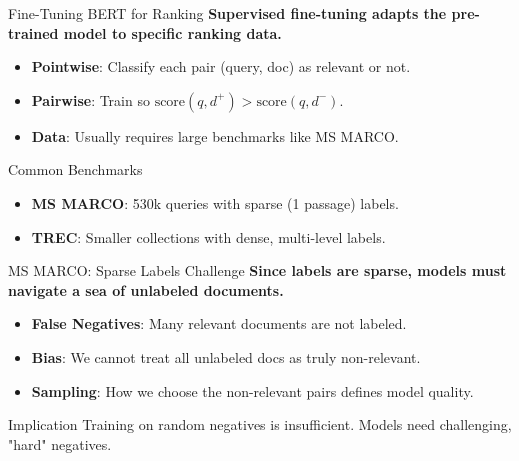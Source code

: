 \documentclass[aspectratio=169]{beamer}
\newif\ifanimated
\newcommand{\cpause}{\ifanimated\pause\fi}
\begin{document}
\begin{frame}{Fine-Tuning BERT for Ranking}
\textbf{Supervised fine-tuning adapts the pre-trained model to specific ranking data.}

\vspace{0.8em}
\begin{itemize}
    \item \textbf{Pointwise}: Classify each pair (query, doc) as relevant or not.
    \item \textbf{Pairwise}: Train so $\text{score}(q, d^+) > \text{score}(q, d^-)$.
    \item \textbf{Data}: Usually requires large benchmarks like MS MARCO.
\end{itemize}

\vspace{1em}
\cpause
\begin{block}{Common Benchmarks}
\begin{itemize}
    \item \textbf{MS MARCO}: 530k queries with sparse (1 passage) labels.
    \item \textbf{TREC}: Smaller collections with dense, multi-level labels.
\end{itemize}
\end{block}
\end{frame}

\begin{frame}{MS MARCO: Sparse Labels Challenge}
\textbf{Since labels are sparse, models must navigate a sea of unlabeled documents.}

\vspace{0.8em}
\begin{itemize}
    \item \textbf{False Negatives}: Many relevant documents are not labeled.
    \item \textbf{Bias}: We cannot treat all unlabeled docs as truly non-relevant.
    \item \textbf{Sampling}: How we choose the non-relevant pairs defines model quality.
\end{itemize}

\vspace{1em}
\cpause
\begin{exampleblock}{Implication}
Training on random negatives is insufficient. Models need challenging, "hard" negatives.
\end{exampleblock}
\end{frame}
\end{document}
